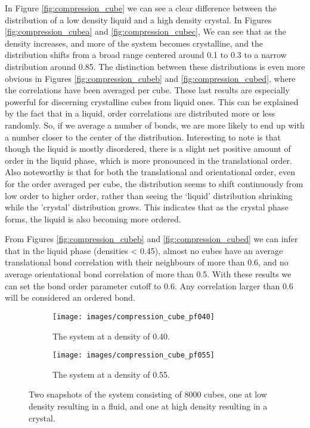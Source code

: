 \documentclass[thesis]{subfiles}
\begin{document}
In Figure \ref{fig:compression_cube} we can see a clear difference between the distribution of a low density liquid and a high density crystal. In Figures \ref{fig:compression_cubea} and \ref{fig:compression_cubec}, We can see that as the density increases, and more of the system becomes crystalline, and the distribution shifts from a broad range centered around 0.1 to 0.3 to a narrow distribution around 0.85. The distinction between these distributions is even more obvious in Figures \ref{fig:compression_cubeb} and \ref{fig:compression_cubed}, where the correlations have been averaged per cube. These last results are especially powerful for discerning crystalline cubes from liquid ones. This can be explained by the fact that in a liquid, order correlations are distributed more or less randomly. So, if we average a number of bonds, we are more likely to end up with a number closer to the center of the distribution.
Interesting to note is that though the liquid is mostly disordered, there is a slight net positive amount of order in the liquid phase, which is more pronounced in the translational order. Also noteworthy is that for both the translational and orientational order, even for the order averaged per cube, the distribution seems to shift continuously from low order to higher order, rather than seeing the `liquid' distribution shrinking while the 'crystal' distribution grows. This indicates that as the crystal phase forms, the liquid is also becoming more ordered.

From Figures \ref{fig:compression_cubeb} and \ref{fig:compression_cubed} we can infer that in the liquid phase (densities < 0.45), almost no cubes have an average translational bond correlation with their neighbours of more than 0.6, and no average orientational bond correlation of more than 0.5. With these results we can set the bond order parameter cutoff to 0.6. Any correlation larger than 0.6 will be considered an ordered bond.

\begin{figure}[h]
	{\centering
		\hfill
		\begin{subfigure}{0.4\textwidth}
			\centering
			\texttt{[image: images/compression\_cube\_pf040]}
			\caption{The system at a density of 0.40.}
		\end{subfigure}\hfill
		\begin{subfigure}{0.4\textwidth}
			\centering
			\texttt{[image: images/compression\_cube\_pf055]}
			\caption{The system at a density of 0.55.}
		\end{subfigure}
		\hfill}
	\caption{Two snapshots of the system consisting of 8000 cubes, one at low density resulting in a fluid, and one at high density resulting in a crystal.}
	\label{fig:compression_cube_snapshots}
\end{figure}
\end{document}
